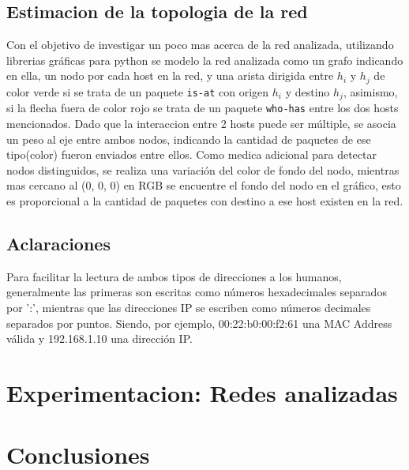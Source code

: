 \subsection{Estimacion de la topologia de la red}
Con el objetivo de investigar un poco mas acerca de la red analizada, utilizando librerias gr\'aficas para python se modelo la red analizada como un grafo indicando en ella, un nodo por cada host en la red, y una arista dirigida entre $h_i$ y $h_j$ de color {\color{green}verde} si se trata de un paquete \texttt{is-at} con origen $h_i$ y destino $h_j$, asimismo, si la flecha fuera de color {\color{red}rojo} se trata de un paquete \texttt{who-has} entre los dos hosts mencionados. Dado que la interaccion entre 2 hosts puede ser m\'ultiple, se asocia un peso al eje entre ambos nodos, indicando la cantidad de paquetes de ese tipo(color) fueron enviados entre ellos. Como medica adicional para detectar nodos distinguidos, se realiza una variaci\'on del color de fondo del nodo, mientras mas cercano al (0, 0, 0) en RGB se encuentre el fondo del nodo en el gr\'afico, esto es proporcional a la cantidad de paquetes con destino a ese host existen en la red.

\subsection{Aclaraciones}
Para facilitar la lectura de ambos tipos de direcciones a los humanos, generalmente las primeras son escritas como números hexadecimales separados por ':', mientras que las direcciones IP se escriben como números decimales separados por puntos. Siendo, por ejemplo, 00:22:b0:00:f2:61 una MAC Address válida y 192.168.1.10 una dirección IP.

\section{Experimentacion: Redes analizadas}
 
 
 
 
 
\section{Conclusiones}

